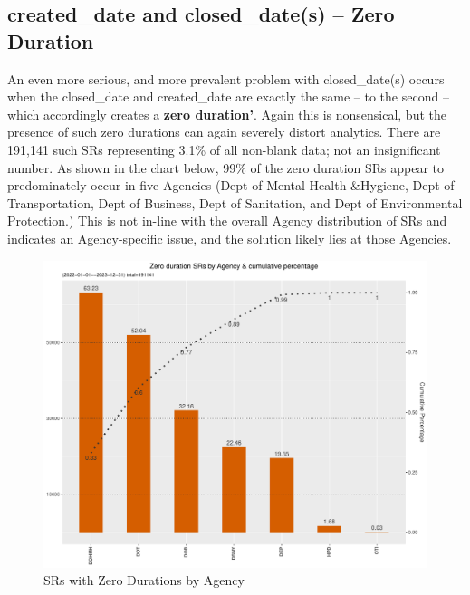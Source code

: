 \documentclass[12pt, titlepage]{article}
\begin{document}
{	\subsection{created\_date and closed\_date(s) --  Zero Duration}		
	An even more serious, and more prevalent problem with closed\_date(s) 
	occurs when the closed\_date and created\_date are exactly the same -- to 
	the second -- which accordingly creates a \textbf{zero duration'}. Again 
	this is nonsensical, but the presence of such zero durations can again 
	severely distort analytics. There are 191,141 such SRs representing 3.1\% of 
	all non-blank data; not an insignificant number. As shown in the chart 
	below, 99\% of the zero duration SRs appear to predominately occur in five 
	Agencies (Dept of Mental Health \&Hygiene, Dept of Transportation, 
	Dept of Business, Dept of Sanitation, and Dept of Environmental Protection.) 
	This is not in-line with the overall Agency distribution of SRs and indicates an 
	Agency-specific issue, and the solution likely lies at those Agencies.
	
	\begin{figure}[tbp]
		 \centering
		 \includegraphics[width = \textwidth]{zero_duration_SR.pdf}
		 \caption{SRs with Zero Durations by Agency}
		 \label{fig:zero-duration}
	\end{figure}	
		
}
\end{document}
